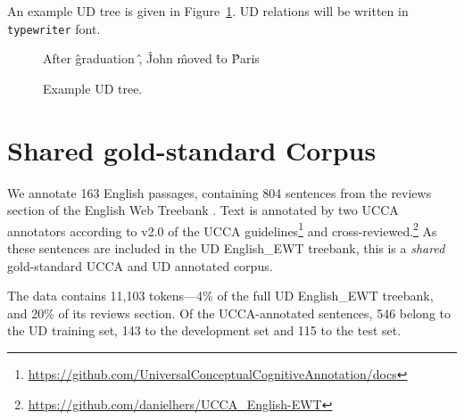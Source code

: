 \documentclass[11pt,a4paper,table]{article}
\newcommand{\daniel}[1]{\footnote{\color{blue}DH: #1}}
\begin{document}
An example UD tree is given in Figure~\ref{fig:original_example_ud}.
UD relations will be written in \texttt{typewriter} font.

\begin{figure}[th]
  \centering
    \begin{dependency}[text only label, label style={above,font=\tt}, font=\small]
    \begin{deptext}[column sep=.8em,ampersand replacement=\^]
    After \^ graduation \^ , \^ John \^ moved \^ to \^ Paris \\
    \end{deptext}
    \end{dependency}
\caption{Example UD tree.\label{fig:original_example_ud}}
\end{figure}

\section{Shared gold-standard Corpus}\label{sec:shared}

We annotate 163 English passages, containing 804 sentences
from the reviews section of the 
English Web Treebank \cite[EWT; ][]{bies2012english}.
Text is annotated by two UCCA annotators
according to v2.0 of the UCCA
guidelines\footnote{\url{https://github.com/UniversalConceptualCognitiveAnnotation/docs}}
and cross-reviewed.\footnote{\url{https://github.com/danielhers/UCCA_English-EWT}}
As these sentences are included in the UD
English\_EWT treebank, this is a \textit{shared} gold-standard UCCA and UD
annotated corpus.

The data contains 11,103 tokens---4\% of the full UD English\_EWT treebank,
and 20\% of its reviews section.
Of the UCCA-annotated sentences, 546 belong to the UD training set,
143 to the development set and 115 to the test set.

\end{document}
